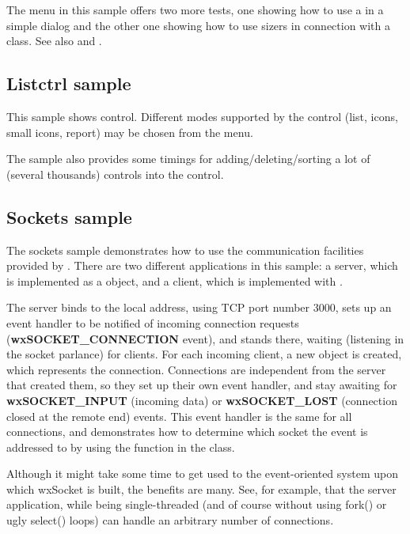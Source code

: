 The menu in this sample offers two more tests, one showing how to use
a  in a simple dialog and the other one
showing how to use sizers in connection with a 
class. See also  and 
.

\subsection{Listctrl sample}\label{samplelistctrl}

This sample shows  control. Different modes
supported by the control (list, icons, small icons, report) may be chosen from
the menu.

The sample also provides some timings for adding/deleting/sorting a lot of
(several thousands) controls into the control.

\subsection{Sockets sample}\label{samplesockets}

The sockets sample demonstrates how to use the communication facilities
provided by . There are two different
applications in this sample: a server, which is implemented as a
 object, and a client, which is
implemented with .

The server binds to the local address, using TCP port number 3000, sets
up an event handler to be notified of incoming connection requests
({\bf wxSOCKET\_CONNECTION} event), and stands there, waiting (listening
in the socket parlance) for clients. For each incoming client, a new
 object is created, which represents
the connection. Connections are independent from the server that created
them, so they set up their own event handler, and stay awaiting for
{\bf wxSOCKET\_INPUT} (incoming data) or {\bf wxSOCKET\_LOST} (connection
closed at the remote end) events. This event handler is the same for all
connections, and demonstrates how to determine which socket the event
is addressed to by using the  function
in the  class.

Although it might take some time to get used to the event-oriented
system upon which wxSocket is built, the benefits are many. See, for
example, that the server application, while being single-threaded
(and of course without using fork() or ugly select() loops) can handle
an arbitrary number of connections.

